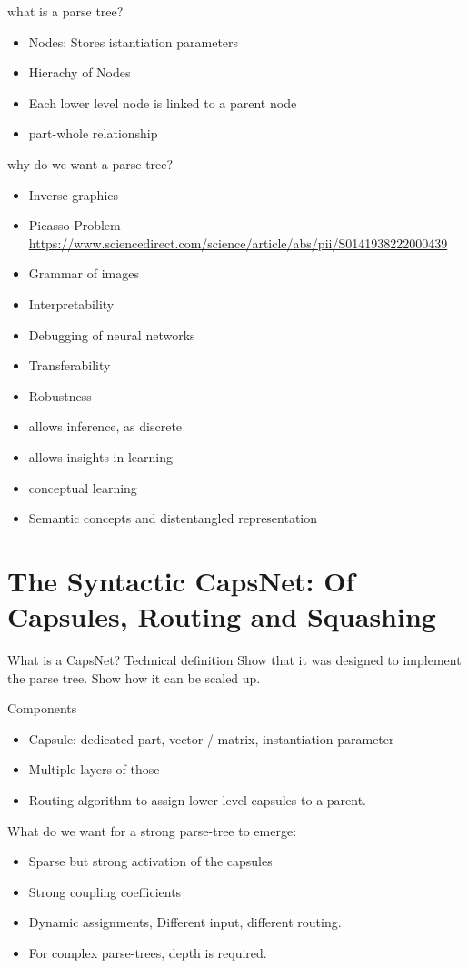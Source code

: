 \documentclass{article}
\begin{document}
what is a parse tree?
\begin{itemize}
	\item Nodes: Stores istantiation parameters
	\item Hierachy of Nodes
	\item Each lower level node is linked to a parent node
	\item part-whole relationship
\end{itemize}
why do we want a parse tree?
\begin{itemize}
	\item Inverse graphics
	\item Picasso Problem \url{https://www.sciencedirect.com/science/article/abs/pii/S0141938222000439}
	\item Grammar of images
	\item Interpretability
	\item Debugging of neural networks
	\item Transferability
	\item Robustness
	\item allows inference, as discrete
	\item allows insights in learning
	\item conceptual learning
	\item Semantic concepts and distentangled representation
\end{itemize}

\section{The Syntactic CapsNet: Of Capsules, Routing and Squashing}

What is a CapsNet? Technical definition
Show that it was designed to implement the parse tree.
Show how it can be scaled up.

Components
\begin{itemize}
	\item Capsule: dedicated part, vector / matrix, instantiation parameter
	\item Multiple layers of those
	\item Routing algorithm to assign lower level capsules to a parent.
\end{itemize}

What do we want for a strong parse-tree to emerge:
\begin{itemize}
	\item Sparse but strong activation of the capsules
	\item Strong coupling coefficients
	\item Dynamic assignments, Different input, different routing.
	\item For complex parse-trees, depth is required.
\end{itemize}
\end{document}
